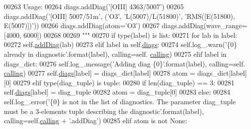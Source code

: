 \begin{DoxyCode}
00263 \textcolor{stringliteral}{        Usage:}
00264 \textcolor{stringliteral}{        diags.addDiag('[OIII] 4363/5007')}
00265 \textcolor{stringliteral}{        diags.addDiag('[OIII] 5007/51m', ('O3', 'L(5007)/L(51800)', 'RMS([E(51800), E(5007)])'))}
00266 \textcolor{stringliteral}{        diags.addDiag(atom='O3')}
00267 \textcolor{stringliteral}{        diags.addDiag(wave\_range=[4000, 6000])}
00268 \textcolor{stringliteral}{}
00269 \textcolor{stringliteral}{        """}
00270         \textcolor{keywordflow}{if} type(label) \textcolor{keywordflow}{is} list:
00271             \textcolor{keywordflow}{for} lab \textcolor{keywordflow}{in} label:
00272                 self.\hyperlink{classpyneb_1_1core_1_1diags_1_1_diagnostics_a508fa9c5a2216f9eb4128338c33a6f75}{addDiag}(lab)
00273         \textcolor{keywordflow}{elif} label \textcolor{keywordflow}{in} self.\hyperlink{classpyneb_1_1core_1_1diags_1_1_diagnostics_a0c0f7e36097677f61a6a14a0c3127b02}{diags}:
00274             self.log\_.warn(\textcolor{stringliteral}{'\{0\} already in diagnostic'}.format(label), calling=self.
      \hyperlink{classpyneb_1_1core_1_1diags_1_1_diagnostics_a07dce673fec8b2383ef411ab94b0b2fe}{calling})
00275         \textcolor{keywordflow}{elif} label \textcolor{keywordflow}{in} diags\_dict:
00276             self.log\_.message(\textcolor{stringliteral}{'Adding diag \{0\}'}.format(label), calling=self.
      \hyperlink{classpyneb_1_1core_1_1diags_1_1_diagnostics_a07dce673fec8b2383ef411ab94b0b2fe}{calling})
00277             self.\hyperlink{classpyneb_1_1core_1_1diags_1_1_diagnostics_a0c0f7e36097677f61a6a14a0c3127b02}{diags}[label] = diags\_dict[label]
00278             atom = diags\_dict[label][0]
00279         \textcolor{keywordflow}{elif} type(diag\_tuple) \textcolor{keywordflow}{is} tuple:
00280             \textcolor{keywordflow}{if} len(diag\_tuple) == 3:    
00281                 self.\hyperlink{classpyneb_1_1core_1_1diags_1_1_diagnostics_a0c0f7e36097677f61a6a14a0c3127b02}{diags}[label] = diag\_tuple
00282                 atom = diag\_tuple[0]
00283             \textcolor{keywordflow}{else}:
00284                 self.log\_.error(\textcolor{stringliteral}{'\{0\} is not in the list of diagnostics. The parameter diag\_tuple must be a
       3-elements tuple describing the diagnostic'}.format(label), calling=self.\hyperlink{classpyneb_1_1core_1_1diags_1_1_diagnostics_a07dce673fec8b2383ef411ab94b0b2fe}{calling} + \textcolor{stringliteral}{'.addDiag'})
00285         \textcolor{keywordflow}{elif} atom \textcolor{keywordflow}{is} \textcolor{keywordflow}{not} \textcolor{keywordtype}{None}:

\end{DoxyCode}
